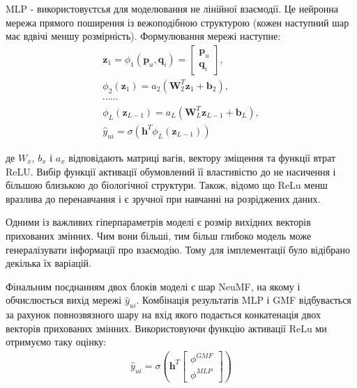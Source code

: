 MLP - використовуєтсья для моделювання не лінійної взаємодії. Це нейронна мережа прямого поширення із вежоподібною структурою (кожен наступний шар має вдвічі меншу розмірність). Формулювання мережі наступне:
\begin{align}
    \mathbf{z}_1 =\phi_1\left(\mathbf{p}_u, \mathbf{q}_i\right)=\left[\begin{array}{c}\mathbf{p}_u \\
                                                                              \mathbf{q}_i\end{array}\right],  \\
    \phi_2\left(\mathbf{z}_1\right) =a_2\left(\mathbf{W}_2^T \mathbf{z}_1+\mathbf{b}_2\right),         \\
    \cdots \cdots                                                                                      \\
    \phi_L\left(\mathbf{z}_{L-1}\right) =a_L\left(\mathbf{W}_L^T \mathbf{z}_{L-1}+\mathbf{b}_L\right), \\
    \hat{y}_{u i} =\sigma\left(\mathbf{h}^T \phi_L\left(\mathbf{z}_{L-1}\right)\right)
\end{align}

де $W_{x}$, $b_{x}$ і $a_{x}$ відповідають матриці вагів, вектору зміщення та функції втрат ReLU. Вибір функції активації обумовлений її властивістю до не насичення і більшою близькою до біологічної структури. Також, відомо що ReLu менш вразлива до перенавчання і є зручної при навчанні на розріджених даних.

Одними із важливих гіперпараметрів моделі є розмір вихідних векторів прихованих змінних. Чим вони більші, тим більш глибоко модель може генералізувати інформації про взаємодію. Тому для імплементації було відібрано декілька їх варіацій.

Фінальним поєднанням двох блоків моделі є шар NeuMF, на якому і обчислюється вихід мережі $\hat{y}_{u i}$. Комбінація результатів MLP і GMF відбувається за рахунок повнозвязного шару на вхід якого подається конкатенація двох векторів прихованих змінних. Використовуючи функцію активації ReLu ми отримуємо таку оцінку:
\begin{align}
    \hat{y}_{u i}=\sigma\left(\mathbf{h}^T\left[\begin{array}{l}
                                                        \phi^{G M F} \\
                                                        \phi^{M L P}
                                                    \end{array}\right]\right)
\end{align}

